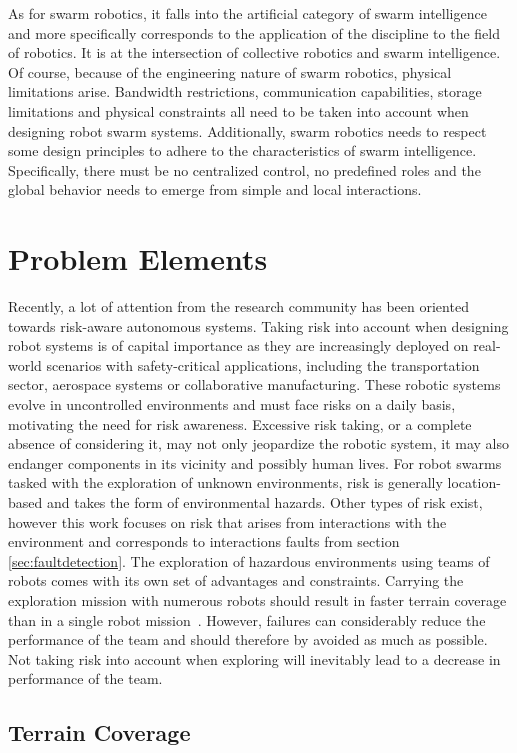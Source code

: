 As for swarm robotics, it falls into the artificial category of swarm intelligence and more specifically corresponds to the application of the discipline to the field of robotics. It is at the intersection of collective robotics and swarm intelligence. Of course, because of the engineering nature of swarm robotics, physical limitations arise. Bandwidth restrictions, communication capabilities, storage limitations and physical constraints all need to be taken into account when designing robot swarm systems. Additionally, swarm robotics needs to respect some design principles to adhere to the characteristics of swarm intelligence. Specifically, there must be no centralized control, no predefined roles and the global behavior needs to emerge from simple and local interactions.

\section{Problem Elements}
Recently, a lot of attention from the research community has been oriented towards risk-aware autonomous systems. Taking risk into account when designing robot systems is of capital importance as they are increasingly deployed on real-world scenarios with safety-critical applications, including the transportation sector, aerospace systems or collaborative manufacturing. These robotic systems evolve in uncontrolled environments and must face risks on a daily basis, motivating the need for risk awareness. Excessive risk taking, or a complete absence of considering it, may not only jeopardize the robotic system, it may also endanger components in its vicinity and possibly human lives. For robot swarms tasked with the exploration of unknown environments, risk is generally location-based and takes the form of environmental hazards. Other types of risk exist, however this work focuses on risk that arises from interactions with the environment and corresponds to interactions faults from section \ref{sec:faultdetection}. The exploration of hazardous environments using teams of robots comes with its own set of advantages and constraints. Carrying the exploration mission with numerous robots should result in faster terrain coverage than in a single robot mission~\cite{burgard2005coordinated}.  However, failures can considerably reduce the performance of the team and should therefore by avoided as much as possible. Not taking risk into account when exploring will inevitably lead to a decrease in performance of the team. 

\subsection{Terrain Coverage}
\label{sec:problemCoverage}

